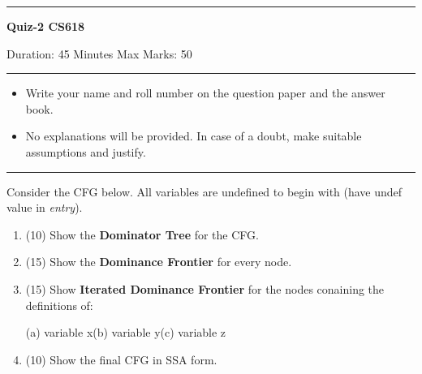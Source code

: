 \documentclass[11pt]{article}
\begin{document}
\noindent \rule{\textwidth}{.2mm}
\begin{center}
{\large {\bf Quiz-2 CS618} }

Duration: 45 Minutes \hfill Max Marks: 50
\end{center} 
\noindent \rule{\textwidth}{.2mm}
\begin{itemize}
\item Write your name and roll number on the question paper and the
  answer book.
\item No explanations will be provided. In case of a doubt, make
  suitable assumptions and justify.
\end{itemize}
\noindent \rule{\textwidth}{.2mm}

\noindent Consider the  CFG below. All  variables are undefined to begin with (have {\rm undef} value in {\em entry}).
    \begin{enumerate}
    \item (10) Show the {\bf Dominator Tree} for the CFG. 
    \item (15) Show the {\bf Dominance Frontier} for every node. 
    \item (15) Show {\bf Iterated Dominance Frontier} for the nodes conaining the definitions of:
      \begin{center}
        \mbox{}\hfill(a)  variable x\hfill (b)  variable y\hfill (c) variable z\hfill\mbox{}
      \end{center}
    \item (10) Show the final CFG in SSA form.
    \end{enumerate}
\end{document}
